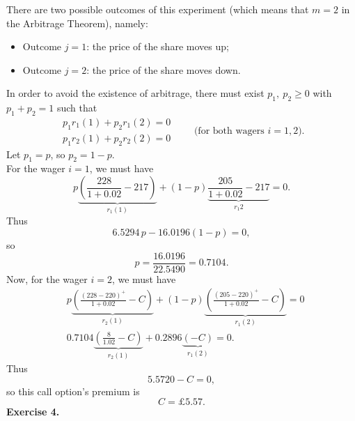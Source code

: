 \documentclass[11pt,a4paper]{article}
\begin{document}
    There are two possible outcomes of this experiment (which means that $m = 2$ in the Arbitrage Theorem), namely:
    \begin{itemize}
        \item Outcome $j = 1$: the price of the share moves up;
        \item Outcome $j = 2$: the price of the share moves down.
    \end{itemize}
    In order to avoid the existence of arbitrage, there must exist $p_1,\ p_2 \geq 0$ with $p_1 + p_2 = 1$ such that
    \begin{equation*}
        \begin{aligned}
            p_1r_1(1) + p_2r_1(2) = 0\\
            p_1r_2(1)+p_2r_2(2) = 0
        \end{aligned}
        \qquad \text{(for both wagers $i = 1, 2$).}
    \end{equation*}
    Let $p_1 = p$, so $p_2 = 1 − p$.\\
    \hspace*{0.5cm} For the wager $i = 1$, we must have
    $$
    p\underbrace{\left(\frac{228}{1+0.02}-217\right)}_{r_1(1)}+(1-p)\underbrace{\frac{205}{1+0.02}-217}_{r_1{2}} = 0.
    $$
    Thus
    $$
    6.5294\, p − 16.0196 (1 − p) = 0 ,
    $$
    so 
    $$
    p = \frac{16.0196}{22.5490} = 0.7104.
    $$
    Now, for the wager $i = 2$, we must have
    \begin{align*}
        & p\underbrace{\left(\frac{(228-220)^+}{1+0.02}-C\right)}_{r_2(1)}+(1-p)\underbrace{\left(\frac{(205-220)^+}{1+0.02}-C\right)}_{r_1(2)}=0\\
        & 0.7104 \underbrace{\left(\frac{8}{1.02}-C\right)}_{r_2(1)}+0.2896\underbrace{\left(-C\right)}_{r_1(2)} = 0.
    \end{align*}
    Thus
    $$
    5.5720 − C = 0,
    $$
    so this call option’s premium is
    $$
    C = \pounds 5.57.
    $$
    \textbf{Exercise 4.}
\end{document}
